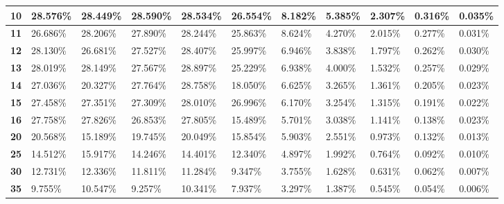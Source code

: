 \begin{table}[ht]
\begin{tabular}{|l|l|l|l|l|l|l|l|l|l|l|}
\textbf{10}      & 28.576\%          & 28.449\%          & 28.590\%          & 28.534\%          & 26.554\%         & 8.182\%          & 5.385\%         & 2.307\%         & 0.316\%         & 0.035\%        \\ \hline
\textbf{11}      & 26.686\%          & 28.206\%          & 27.890\%          & 28.244\%          & 25.863\%         & 8.624\%          & 4.270\%         & 2.015\%         & 0.277\%         & 0.031\%        \\ \hline
\textbf{12}      & 28.130\%          & 26.681\%          & 27.527\%          & 28.407\%          & 25.997\%         & 6.946\%          & 3.838\%         & 1.797\%         & 0.262\%         & 0.030\%        \\ \hline
\textbf{13}      & 28.019\%          & 28.149\%          & 27.567\%          & 28.897\%          & 25.229\%         & 6.938\%          & 4.000\%         & 1.532\%         & 0.257\%         & 0.029\%        \\ \hline
\textbf{14}      & 27.036\%          & 20.327\%          & 27.764\%          & 28.758\%          & 18.050\%         & 6.625\%          & 3.265\%         & 1.361\%         & 0.205\%         & 0.023\%        \\ \hline
\textbf{15}      & 27.458\%          & 27.351\%          & 27.309\%          & 28.010\%          & 26.996\%         & 6.170\%          & 3.254\%         & 1.315\%         & 0.191\%         & 0.022\%        \\ \hline
\textbf{16}      & 27.758\%          & 27.826\%          & 26.853\%          & 27.805\%          & 15.489\%         & 5.701\%          & 3.038\%         & 1.141\%         & 0.138\%         & 0.023\%        \\ \hline
\textbf{20}      & 20.568\%          & 15.189\%          & 19.745\%          & 20.049\%          & 15.854\%         & 5.903\%          & 2.551\%         & 0.973\%         & 0.132\%         & 0.013\%        \\ \hline
\textbf{25}      & 14.512\%          & 15.917\%          & 14.246\%          & 14.401\%          & 12.340\%         & 4.897\%          & 1.992\%         & 0.764\%         & 0.092\%         & 0.010\%        \\ \hline
\textbf{30}      & 12.731\%          & 12.336\%          & 11.811\%          & 11.284\%          & 9.347\%          & 3.755\%          & 1.628\%         & 0.631\%         & 0.062\%         & 0.007\%        \\ \hline
\textbf{35}      & 9.755\%           & 10.547\%          & 9.257\%           & 10.341\%          & 7.937\%          & 3.297\%          & 1.387\%         & 0.545\%         & 0.054\%         & 0.006\%        \\ \hline

\end{tabular}
\end{table}
